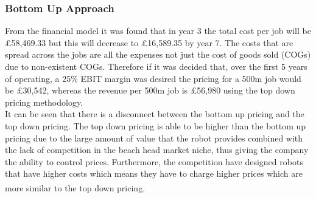 \documentclass[11pt]{article}		%
\newcommand{\supercite}[1]{\textsuperscript{\cite{#1}}}		%
\begin{document}
            \subsubsection{Bottom Up Approach}

	            From the financial model it was found that in year 3 the total cost per job will be £58,469.33 but this will decrease to £16,589.35 by year 7. The costs that are spread across the jobs are all the expenses not just the cost of goods sold (COGs) due to non-existent COGs. Therefore if it was decided that, over the first 5 years of operating, a 25\% EBIT margin was desired the pricing for a 500m job would be £30,542, whereas the revenue per 500m job is £56,980 using the top down pricing methodology.
	            \\
	            It can be seen that there is a disconnect between the bottom up pricing and the top down pricing. The top down pricing is able to be higher than the bottom up pricing due to the large amount of value that the robot provides combined with the lack of competition in the beach head market niche, thus giving the company the ability to control prices. Furthermore, the competition have designed robots that have higher costs which means they have to charge higher prices which are more similar to the top down pricing.\supercite{Barney}
            
\end{document}
